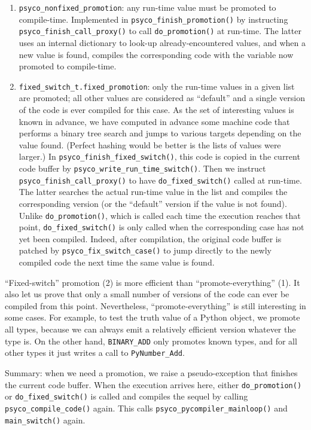 \documentclass{article}
\def\code#1{\texttt{#1}}
\begin{document}
\begin{enumerate}
\item \code{psyco_nonfixed_promotion}: any run-time value must be promoted to compile-time. Implemented in \code{psyco_finish_promotion()} by instructing \code{psyco_finish_call_proxy()} to call \code{do_promotion()} at run-time. The latter uses an internal dictionary to look-up already-encountered values, and when a new value is found, compiles the corresponding code with the variable now promoted to compile-time.
\item \code{fixed_switch_t.fixed_promotion}: only the run-time values in a given list are promoted; all other values are considered as ``default'' and a single version of the code is ever compiled for this case. As the set of interesting values is known in advance, we have computed in advance some machine code that performs a binary tree search and jumps to various targets depending on the value found. (Perfect hashing would be better is the lists of values were larger.) In \code{psyco_finish_fixed_switch()}, this code is copied in the current code buffer by \code{psyco_write_run_time_switch()}. Then we instruct \code{psyco_finish_call_proxy()} to have \code{do_fixed_switch()} called at run-time. The latter searches the actual run-time value in the list and compiles the corresponding version (or the ``default'' version if the value is not found). Unlike \code{do_promotion()}, which is called each time the execution reaches that point, \code{do_fixed_switch()} is only called when the corresponding case has not yet been compiled. Indeed, after compilation, the original code buffer is patched by \code{psyco_fix_switch_case()} to jump directly to the newly compiled code the next time the same value is found.
\end{enumerate}

``Fixed-switch'' promotion (2) is more efficient than ``promote-everything'' (1). It also let us prove that only a small number of versions of the code can ever be compiled from this point. Nevertheless, ``promote-everything'' is still interesting in some cases. For example, to test the truth value of a Python object, we promote all types, because we can always emit a relatively efficient version whatever the type is. On the other hand, \code{BINARY_ADD} only promotes known types, and for all other types it just writes a call to \code{PyNumber_Add}.

\medskip

Summary: when we need a promotion, we raise a pseudo-exception that finishes the current code buffer. When the execution arrives here, either \code{do_promotion()} or \code{do_fixed_switch()} is called and compiles the sequel by calling \code{psyco_compile_code()} again. This calls \code{psyco_pycompiler_mainloop()} and \code{main_switch()} again.
\end{document}
